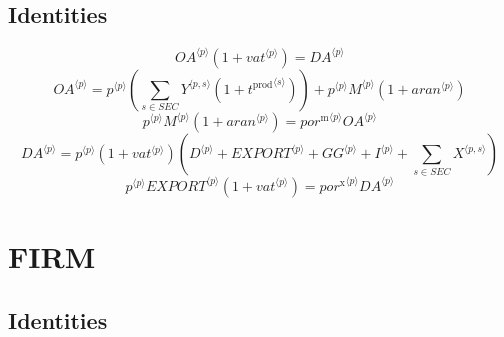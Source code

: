 \subsection{Identities}

\begin{equation}
{{{O\!A}}^{\langle p\rangle}} \left(1 + {{v\!a\!t}}^{\langle p\rangle}\right) = {{D\!A}}^{\langle p\rangle}
\end{equation}
\begin{equation}
{{O\!A}}^{\langle p\rangle} = {{p}^{\langle p\rangle}} \left(\sum_{s\in {S\!E\!C}} {{Y}^{\langle p,s\rangle}} \left(1 + {t^{\mathrm{prod}}}^{\langle s\rangle}\right)\right) + {{p}^{\langle p\rangle}} {{M}^{\langle p\rangle}} \left(1 + {{a\!r\!a\!n}}^{\langle p\rangle}\right)
\end{equation}
\begin{equation}
{{p}^{\langle p\rangle}} {{M}^{\langle p\rangle}} \left(1 + {{a\!r\!a\!n}}^{\langle p\rangle}\right) = {{{p\!o\!r}^{\mathrm{m}}}^{\langle p\rangle}} {{{O\!A}}^{\langle p\rangle}}
\end{equation}
\begin{equation}
{{D\!A}}^{\langle p\rangle} = {{p}^{\langle p\rangle}} \left(1 + {{v\!a\!t}}^{\langle p\rangle}\right) \left({D}^{\langle p\rangle} + {{E\!X\!P\!O\!R\!T}}^{\langle p\rangle} + {{G\!G}}^{\langle p\rangle} + {I}^{\langle p\rangle} + \sum_{s\in {S\!E\!C}} {X}^{\langle p,s\rangle}\right)
\end{equation}
\begin{equation}
{{p}^{\langle p\rangle}} {{{E\!X\!P\!O\!R\!T}}^{\langle p\rangle}} \left(1 + {{v\!a\!t}}^{\langle p\rangle}\right) = {{{p\!o\!r}^{\mathrm{x}}}^{\langle p\rangle}} {{{D\!A}}^{\langle p\rangle}}
\end{equation}




\section{FIRM}

\subsection{Identities}

